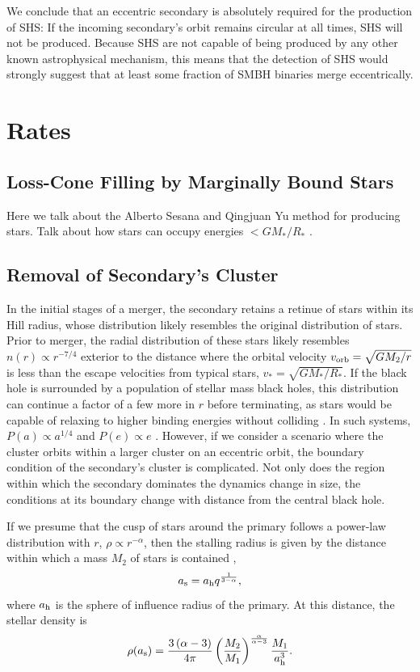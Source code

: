 \documentclass[a4paper,twocolumn]{emulateapj}
\begin{document}
We conclude that an eccentric secondary is absolutely required for the production of SHS: If the incoming secondary's orbit remains circular at all times, SHS will not be produced. Because SHS are not capable of being produced by any other known astrophysical mechanism, this means that the detection of SHS would strongly suggest that at least some fraction of SMBH binaries merge eccentrically.

\section{Rates}

\subsection{Loss-Cone Filling by Marginally Bound Stars}

Here we talk about the Alberto Sesana and Qingjuan Yu method for producing stars. Talk about how stars can occupy energies $< G M_{\ast}/R_{\ast}$ \citep[response to][]{Yu:2003a}.

\subsection{Removal of Secondary's Cluster}
In the initial stages of a merger, the secondary retains a retinue of stars within its Hill radius, whose distribution likely resembles the original distribution of stars. Prior to merger, the radial distribution of these stars likely resembles $n(r) \propto r^{-7/4}$ \citep{Bahcall:1976a} exterior to the distance where the orbital velocity $v_{\rm orb} = \sqrt{G M_{2} / r}$ is less than the escape velocities from typical stars, $v_{\ast} = \sqrt{G M_{\ast} / R_{\ast}}$. If the black hole is surrounded by a population of stellar mass black holes, this distribution can continue a factor of a few more in $r$ before terminating, as stars would be capable of relaxing to higher binding energies without colliding \citep{OLeary:2008a}. In such systems, $P(a) \propto a^{1/4}$ and $P(e) \propto e$ \citep{Merritt:2013a}. However, if we consider a scenario where the cluster orbits within a larger cluster on an eccentric orbit, the boundary condition of the secondary's cluster is complicated. Not only does the region within which the secondary dominates the dynamics change in size, the conditions at its boundary change with distance from the central black hole.

If we presume that the cusp of stars around the primary follows a power-law distribution with $r$, $\rho \propto r^{-\alpha}$, then the stalling radius is given by the distance within which a mass $M_{2}$ of stars is contained ,
\begin{equation}
a_{\rm s} = a_{\rm h} q^{\frac{1}{3-\alpha}},
\label{eq:astall}
\end{equation}
where $a_{\rm h}$ is the sphere of influence radius of the primary. At this distance, the stellar density is
\begin{equation}
\rho(a_{\rm s}) = \frac{3 \left(\alpha - 3\right)}{4 \pi} \left(\frac{M_{2}}{M_{1}}\right)^{\frac{\alpha}{\alpha - 3}} \frac{M_{1}}{a_{\rm h}^{3}}.
\label{eq:rhostall}
\end{equation}
\end{document}
